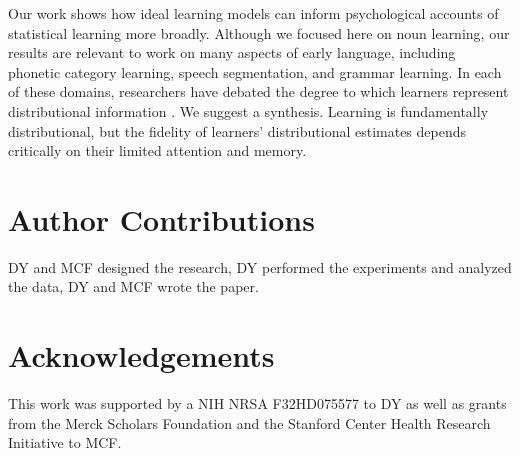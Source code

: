 \documentclass[man,floatsintext]{apa6}
\begin{document}
Our work shows how ideal learning models can inform psychological accounts of statistical learning more broadly. Although we focused here on noun learning, our results are relevant to work on many aspects of early language, including phonetic category learning, speech segmentation, and grammar learning. In each of these domains, researchers have debated the degree to which learners represent distributional information \cite{Endress2005, Frank2010a, McMurray2013}. We suggest a synthesis. Learning is fundamentally distributional, but the fidelity of learners' distributional estimates depends critically on their limited attention and memory.

\section{Author Contributions}

DY and MCF designed the research, DY performed the experiments and analyzed the data, DY and MCF wrote the paper.

\section{Acknowledgements}


This work was supported by a NIH NRSA F32HD075577 to DY as well as grants from the Merck Scholars Foundation and the Stanford Center Health Research Initiative to MCF.



\end{document}
